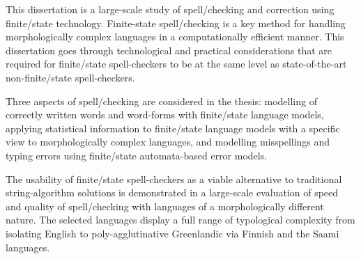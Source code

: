 This dissertation is a large-scale study of spell\-/checking and correction
using finite\-/state technology. Finite-state spell\-/checking is a key method
for handling morphologically complex languages in a computationally
efficient manner. This dissertation goes through technological and practical
considerations that are required for finite\-/state spell-checkers to be at
the same level as state-of-the-art non-finite\-/state spell-checkers. 

Three aspects of spell\-/checking are considered in the thesis: modelling of
correctly written words and word-forms with finite\-/state language
models, applying statistical information to finite\-/state language models
with a specific view to morphologically complex languages, and modelling
misspellings and typing errors using finite\-/state automata-based error
models.

The usability of finite\-/state spell-checkers as a viable alternative to
traditional string-algorithm solutions is demonstrated in a large-scale
evaluation of speed and quality of spell\-/checking with languages of
a morphologically different nature. The selected languages display a
full range of typological complexity from isolating English to 
poly-agglutinative Greenlandic via Finnish and the Saami languages.

